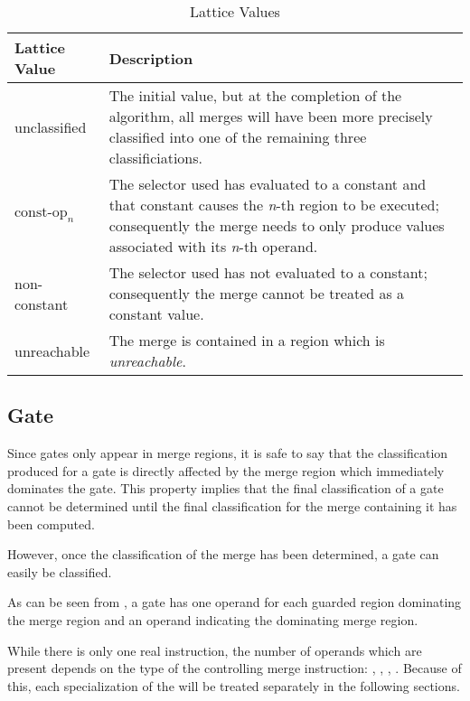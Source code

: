 \begin{table}[h!]
  \begin{tabularx}{\linewidth}{|l|X|}
    \hline Lattice Value & Description \\
    \hline unclassified & The initial value, but at the completion of
    the algorithm, all merges will have been more precisely classified
    into one of the remaining three classificiations. \\

    \hline $\textrm{const-op}_n$ & The selector used has evaluated to
    a constant and that constant causes the \emph{n}-th region to be
    executed; consequently the merge needs to only produce values
    associated with its \emph{n}-th operand. \\

    \hline non-constant & The selector used has not evaluated to a
    constant; consequently the merge cannot be
    treated as a constant value. \\

    \hline unreachable & The merge is contained in a region which is
    \emph{unreachable}. \\
  \hline
  \end{tabularx}
  \caption{ Lattice Values}\label{table:const-prop-case-merge-lattice}
\end{table}

\subsection{Gate}\label{const-prop:classification-of-gate}

Since gates only appear in merge regions, it is safe to say that the
classification produced for a gate is directly affected by the merge
region which immediately dominates the gate.  This property implies
that the final classification of a gate cannot be determined until the
final classification for the merge containing it has been computed.

However, once the classification of the merge has been determined, a
gate can easily be classified.

As can be seen from , a gate has one operand
for each guarded region dominating the merge region and an operand
indicating the dominating merge region.

While there is only one real  instruction, the
number of operands which are present depends on the type of the
controlling merge instruction: ,
, ,
.  Because of this, each specialization of
the  will be treated separately in the following
sections.

